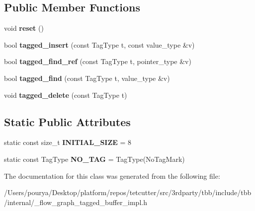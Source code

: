 \subsection*{Public Member Functions}
\begin{DoxyCompactItemize}
\item 
\hypertarget{classtagged__buffer_a3fd3174d6acd94bf8544fa5f5fee8356}{}void {\bfseries reset} ()\label{classtagged__buffer_a3fd3174d6acd94bf8544fa5f5fee8356}

\item 
\hypertarget{classtagged__buffer_a66d2c0e69781ab04e764cbeedf1a504c}{}bool {\bfseries tagged\+\_\+insert} (const Tag\+Type t, const value\+\_\+type \&v)\label{classtagged__buffer_a66d2c0e69781ab04e764cbeedf1a504c}

\item 
\hypertarget{classtagged__buffer_a1a4d2405da9733885d9f322573dd4446}{}bool {\bfseries tagged\+\_\+find\+\_\+ref} (const Tag\+Type t, pointer\+\_\+type \&v)\label{classtagged__buffer_a1a4d2405da9733885d9f322573dd4446}

\item 
\hypertarget{classtagged__buffer_a526b4e58f2f289cf8d96a8b00ea3716b}{}bool {\bfseries tagged\+\_\+find} (const Tag\+Type t, value\+\_\+type \&v)\label{classtagged__buffer_a526b4e58f2f289cf8d96a8b00ea3716b}

\item 
\hypertarget{classtagged__buffer_aed24a034b9b30a0d698bae22a1bee37b}{}void {\bfseries tagged\+\_\+delete} (const Tag\+Type t)\label{classtagged__buffer_aed24a034b9b30a0d698bae22a1bee37b}

\end{DoxyCompactItemize}
\subsection*{Static Public Attributes}
\begin{DoxyCompactItemize}
\item 
\hypertarget{classtagged__buffer_a1aeef92b2b328cba1c6955ff33a3b578}{}static const size\+\_\+t {\bfseries I\+N\+I\+T\+I\+A\+L\+\_\+\+S\+I\+Z\+E} = 8\label{classtagged__buffer_a1aeef92b2b328cba1c6955ff33a3b578}

\item 
\hypertarget{classtagged__buffer_aadc36a28a0f13cf1f299cb3c3b7dcbf3}{}static const Tag\+Type {\bfseries N\+O\+\_\+\+T\+A\+G} = Tag\+Type(No\+Tag\+Mark)\label{classtagged__buffer_aadc36a28a0f13cf1f299cb3c3b7dcbf3}

\end{DoxyCompactItemize}


The documentation for this class was generated from the following file\+:\begin{DoxyCompactItemize}
\item 
/\+Users/pourya/\+Desktop/platform/repos/tetcutter/src/3rdparty/tbb/include/tbb/internal/\+\_\+flow\+\_\+graph\+\_\+tagged\+\_\+buffer\+\_\+impl.\+h\end{DoxyCompactItemize}
